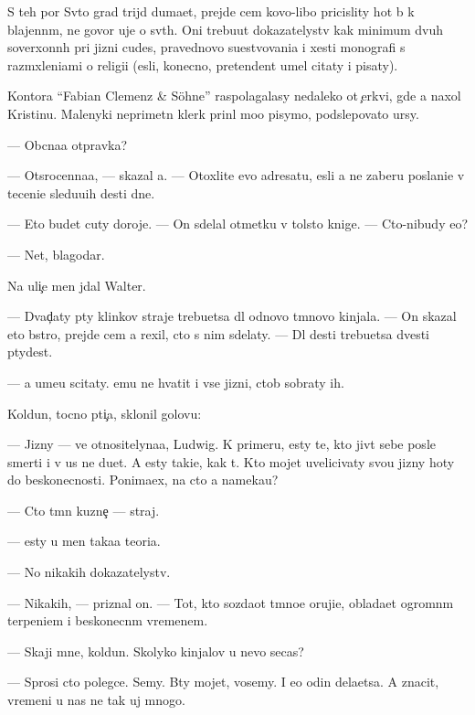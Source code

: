\documentclass[10pt]{book}
\begin{document}
S teh por Sv{\ia}to{\y} grad trijd{\yi} duma{\y}et, prejde cem kovo-libo pricislity hot{\ia} b{\yi} k blajenn{\yi}m, ne go\-vo\-r{\ia} uje o sv{\ia}t{\yi}h. Oni trebu{\y}ut dokazatelystv kak minimum dvuh soverxonn{\yi}h pri jizni cudes, pravednovo su{\x}estvovani{\y}a i xesti monografi{\y} s razm{\yi}xleni{\y}ami o religi{\y}i ({\y}esli, konecno, pretendent umel citaty i pisaty).

Kontora ``Fabian Clemenz \& Söhne'' raspolagalasy nedaleko ot {\c}erkvi, gde {\y}a naxol Kristinu. Malenyki{\y} neprimetn{\yi}{\y} klerk prin{\ia}l mo{\y}o pisymo, podslepovato {\x}ur{\ia}sy.

— Ob{\yi}cna{\y}a otpravka?

— Otsrocenna{\y}a, — skazal {\y}a. — Otoxlite {\y}evo adresatu, {\y}esli {\y}a ne zaberu po\-sla\-ni\-{\y}e v teceni{\y}e sledu{\y}u{\x}ih des{\ia}ti dne{\y}.

— Eto budet cuty doroje. — On sdelal otmetku v tolsto{\y} knige. — Cto-nibudy {\y}e{\x}o?

— Net, blagodar{\io}.

Na uli{\c}e men{\ia} jdal Walter.

— Dvad{\c}aty p{\ia}ty klinkov straje{\y} trebu{\y}etsa dl{\ia} odnovo t{\e}mnovo kinjala. — On skazal eto b{\yi}stro, prejde cem {\y}a rexil, cto s nim sdelaty. — Dl{\ia} des{\ia}ti trebu{\y}etsa dvesti p{\ia}tydes{\ia}t.

— {\Y}a ume{\y}u scitaty. {\Y}emu ne hvatit i vse{\y} jizni, ctob{\yi} sobraty ih.

Koldun, tocno pti{\c}a, sklonil golovu:

— Jizny — ve{\x} otnositelyna{\y}a, Ludwig. K primeru, {\y}esty te, kto jiv{\e}t sebe posle smerti i v us ne du{\y}et. A {\y}esty taki{\y}e, kak t{\yi}. Kto mojet uvelicivaty svo{\y}u jizny hoty do beskonecnosti. Ponima{\y}ex, na cto {\y}a nameka{\y}u?

— Cto t{\e}mn{\yi}{\y} kuzne{\c} — straj.

— {\Y}esty u men{\ia} taka{\y}a teori{\y}a.

— No nikakih dokazatelystv.

— Nikakih, — priznal on. — Tot, kto sozda{\y}ot t{\e}mno{\y}e oruji{\y}e, oblada{\y}et ogrom\-n{\yi}m terpeni{\y}em i beskonecn{\yi}m vremenem.

— Skaji mne, koldun. Skolyko kinjalov u nevo se{\y}cas?

— Sprosi cto polegce. Semy. B{\yi}ty mojet, vosemy. I {\y}e{\x}o odin dela{\y}etsa. A znacit, vremeni u nas ne tak uj mnogo.
\end{document}
